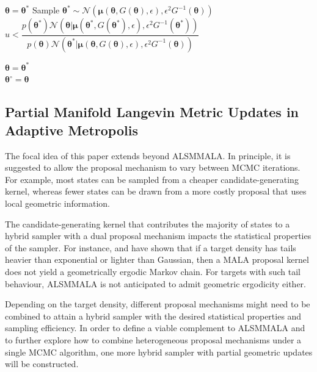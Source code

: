 \documentclass[twoside,11pt]{article}
\begin{document}
{\begin{algorithm}[t]
\begin{algorithmic}
		\State $\boldsymbol{\theta}=\boldsymbol{\theta}^{*}$
		\EndIf
		 
		\State Sample 
		$\boldsymbol{\theta^{*}}
		\sim\mathcal{N}(\boldsymbol{\mu}(\boldsymbol{\theta}, G(\boldsymbol{\theta}), \epsilon),
		\epsilon^2 G^{-1}(\boldsymbol{\theta}))
		$\\
		
		\If
		{
			$u<\dfrac{
				p(\boldsymbol{\theta}^{*})
				\mathcal{N}(\boldsymbol{\theta}|
					\boldsymbol{\mu}(\boldsymbol{\theta}^{*},
					G(\boldsymbol{\theta}^{*}),
					\epsilon),
					\epsilon^2 G^{-1}(\boldsymbol{\theta}^{*}))
			}
			{
				p(\boldsymbol{\theta})
				\mathcal{N}(\boldsymbol{\theta}^{*}|
					\boldsymbol{\mu}(\boldsymbol{\theta},
					G(\boldsymbol{\theta}),
					\epsilon),
					\epsilon^2 G^{-1}(\boldsymbol{\theta}))
			}$
		}
		
		\State $\boldsymbol{\theta}=\boldsymbol{\theta}^{*}$
		\EndIf\\
		
		\State $\boldsymbol{\theta^{\circ}}=\boldsymbol{\theta}$
		\EndIf
		
		\EndFor
	\end{algorithmic}
\end{algorithm}

\subsection{Partial Manifold Langevin Metric Updates in Adaptive Metropolis}

The focal idea of this paper extends beyond ALSMMALA. In principle, it is suggested to allow the proposal mechanism to vary
between MCMC iterations. For example, most states can be sampled from a cheaper candidate-generating kernel, whereas fewer 
states can be drawn from a more costly proposal that uses local geometric information.

The candidate-generating kernel that contributes the majority of states to
a hybrid sampler with a dual proposal mechanism impacts the statistical properties of the sampler.
For instance, \cite{rob_twe__exp} and \cite{liv_gir__inf} have shown that if a target density has tails heavier than 
exponential or lighter than Gaussian, then a MALA proposal kernel does not yield a geometrically ergodic Markov chain. For 
targets with such tail behaviour, ALSMMALA is not anticipated to admit geometric ergodicity either.

Depending on the target density, different proposal mechanisms might need to be combined to attain a hybrid sampler with
the desired statistical properties and sampling efficiency. In order to define a viable complement to ALSMMALA
and to further explore how to combine heterogeneous proposal mechanisms under a single MCMC algorithm, one more 
hybrid sampler with partial geometric updates will be constructed.

}
\end{document}
